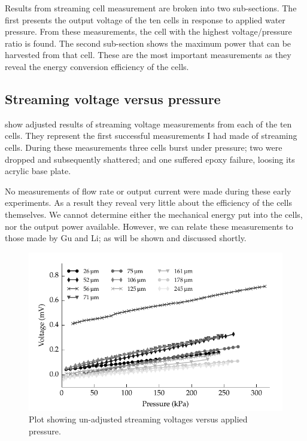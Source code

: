   Results from streaming cell measurement are broken into two sub-sections.
  The first presents the output voltage of the ten cells in response to applied water pressure.
  From these measurements, the cell with the highest voltage/pressure ratio is found.
  The second sub-section shows the maximum power that can be harvested from that cell.
  These are the most important measurements as they reveal the energy conversion efficiency of the cells.


  \subsection{Streaming voltage versus pressure}



     show adjusted results of streaming voltage measurements from each of the ten cells.
    They represent the first successful measurements I had made of streaming cells.
    During these measurements three cells burst under pressure; two were dropped and subsequently shattered; and one suffered epoxy failure, loosing its acrylic base plate.

    No measurements of flow rate or output current were made during these early experiments.
    As a result they reveal very little about the efficiency of the cells themselves.
    We cannot determine either the mechanical energy put into the cells, nor the output power available.
    However, we can relate these measurements to those made by Gu and Li; as will be shown and discussed shortly.

    \begin{figure}
        \centering
        \includegraphics{content/pt1/01-PowerHarvesting/graphics/graph_streamingVoltageGradient_vs_height_noCorrection}
        \caption{\label{fig:streamingCell_all_unadjusted}Plot showing un-adjusted streaming voltages versus applied pressure.}
    \end{figure}

